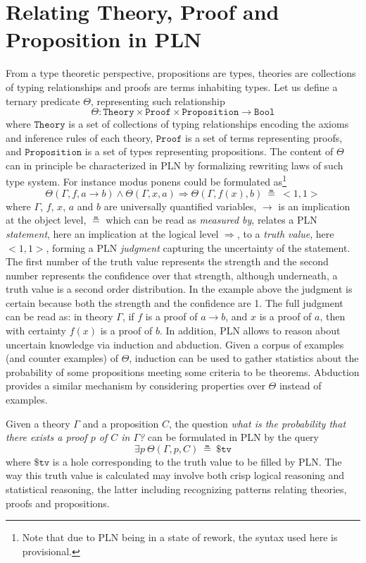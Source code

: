 \documentclass{easychair}
\newcommand{\U}{\Theta}
\newcommand{\Theory}{\texttt{Theory}}
\newcommand{\Proof}{\texttt{Proof}}
\newcommand{\Proposition}{\texttt{Proposition}}
\newcommand{\Bool}{\texttt{Bool}}
\newcommand{\arrow}{\to}
\newcommand{\limp}{\Rightarrow}
\newcommand{\STV}[2]{<\!#1, #2\!>}
\begin{document}
\section{Relating Theory, Proof and Proposition in PLN}

From a type theoretic perspective, propositions are types, theories
are collections of typing relationships and proofs are terms
inhabiting types.  Let us define a ternary predicate $\U$,
representing such relationship
$$\U : \Theory \times \Proof \times \Proposition \arrow \Bool$$ where
$\Theory$ is a set of collections of typing relationships encoding the
axioms and inference rules of each theory, $\Proof$ is a set of terms
representing proofs, and $\Proposition$ is a set of types representing
propositions.  The content of $\U$ can in principle be characterized
in PLN by formalizing rewriting laws of such type system.  For
instance modus ponens could be formulated as\footnote{Note that due to
PLN being in a state of rework, the syntax used here is provisional.}
$$\U(\Gamma, f, a \to b) \land \U(\Gamma, x, a) \limp \U(\Gamma, f(x),
b)\ \measeq\ \STV{1}{1}$$ where $\Gamma$, $f$, $x$, $a$ and $b$ are
universally quantified variables, $\to$ is an implication at the
object level, $\measeq$ which can be read as \emph{measured by},
relates a PLN \emph{statement}, here an implication at the logical
level $\limp$, to a \emph{truth value}, here $\STV{1}{1}$, forming a
PLN \emph{judgment} capturing the uncertainty of the statement.  The
first number of the truth value represents the strength and the second
number represents the confidence over that strength, although
underneath, a truth value is a second order distribution.  In the
example above the judgment is certain because both the strength and
the confidence are 1.  The full judgment can be read as: in theory
$\Gamma$, if $f$ is a proof of $a \arrow b$, and $x$ is a proof of
$a$, then with certainty $f(x)$ is a proof of $b$.  In addition, PLN
allows to reason about uncertain knowledge via induction and
abduction.  Given a corpus of examples (and counter examples) of
$\Theta$, induction can be used to gather statistics about the
probability of some propositions meeting some criteria to be theorems.
Abduction provides a similar mechanism by considering properties over
$\Theta$ instead of examples.

Given a theory $\Gamma$ and a proposition $C$, the question \emph{what
is the probability that there exists a proof $p$ of $C$ in $\Gamma$?}
can be formulated in PLN by the query
$$\exists p\ \U(\Gamma, p, C)\ \measeq\ \$\texttt{tv}$$ where
$\$\texttt{tv}$ is a hole corresponding to the truth value to be
filled by PLN.  The way this truth value is calculated may involve
both crisp logical reasoning and statistical reasoning, the latter
including recognizing patterns relating theories, proofs and
propositions.
\end{document}
